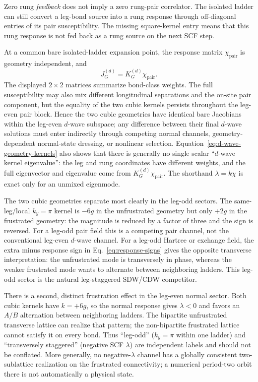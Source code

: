 \documentclass[11pt]{article}
\begin{document}
Zero rung \emph{feedback} does not imply a zero rung-pair correlator.  The
isolated ladder can still convert a leg-bond source into a rung response through
off-diagonal entries of its pair susceptibility.  The missing square-kernel
entry means that this rung response is not fed back as a rung source on the next
SCF step.

At a common bare isolated-ladder expansion point, the response matrix
\(\chi_{\mathrm{pair}}\) is geometry independent, and
\begin{equation}
 J^{(d)}_G=K^{(d)}_G\chi_{\mathrm{pair}}.
 \label{eq:d-wave-jacobian}
\end{equation}
The displayed \(2\times2\) matrices summarize bond-class weights.  The full
susceptibility may also mix different longitudinal separations and the on-site
pair component, but the equality of the two cubic kernels persists throughout
the leg-even pair block.
Hence the two cubic geometries have identical bare Jacobians within the
leg-even \(d\)-wave subspace; any difference between their final \(d\)-wave
solutions must enter indirectly through competing normal channels,
geometry-dependent normal-state dressing, or nonlinear selection.
Equation~\eqref{eq:d-wave-geometry-kernels} also shows
that there is generally no single scalar ``\(d\)-wave kernel eigenvalue'': the
leg and rung coordinates have different weights, and the full eigenvector and
eigenvalue come from \(K^{(d)}_G\chi_{\mathrm{pair}}\).  The shorthand
\(\lambda=k\chi\) is exact only for an unmixed eigenmode.

The two cubic geometries separate most clearly in the leg-odd sectors.  The
same-leg/local \(k_y=\pi\) kernel is \(-6g\) in the unfrustrated geometry but
only \(+2g\) in the frustrated geometry: the magnitude is reduced by a factor
of three and the sign is reversed.  For a leg-odd pair field this is a competing
pair channel, not the conventional leg-even \(d\)-wave channel.  For a leg-odd
Hartree or exchange field, the extra minus response sign in
Eq.~\eqref{eq:response-signs} gives the opposite transverse interpretation:
the unfrustrated mode is transversely in phase, whereas the weaker frustrated
mode wants to alternate between neighboring ladders.  This leg-odd sector is
the natural leg-staggered SDW/CDW competitor.

There is a second, distinct frustration effect in the leg-even normal sector.
Both cubic kernels have \(k=+6g\), so the normal response gives
\(\lambda<0\) and favors an \(A/B\) alternation between neighboring ladders.
The bipartite unfrustrated transverse lattice can realize that pattern; the
non-bipartite frustrated lattice cannot satisfy it on every bond.  Thus
``leg-odd'' (\(k_y=\pi\) within one ladder) and ``transversely staggered''
(negative SCF \(\lambda\)) are independent labels and should not be conflated.
More generally, no negative-\(\lambda\) channel has a globally consistent
two-sublattice realization on the frustrated connectivity; a numerical
period-two orbit there is not automatically a physical state.
\end{document}

